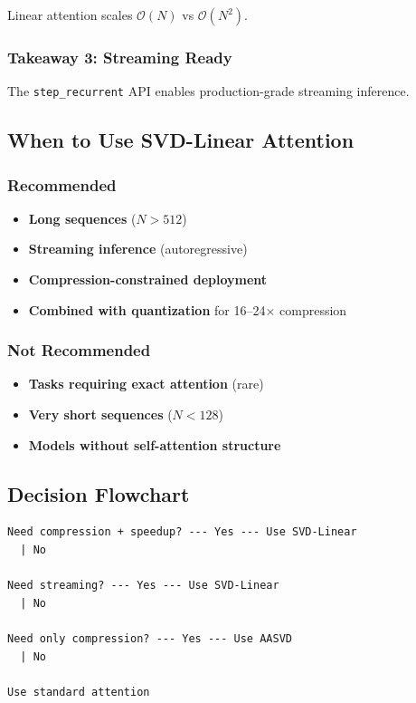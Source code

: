 Linear attention scales $\mathcal{O}(N)$ vs $\mathcal{O}(N^2)$.

\subsubsection{Takeaway 3: Streaming Ready}

The \texttt{step\_recurrent} API enables production-grade streaming inference.

\subsection{When to Use SVD-Linear Attention}

\subsubsection{Recommended}

\begin{itemize}
\item \textbf{Long sequences} ($N > 512$)
\item \textbf{Streaming inference} (autoregressive)
\item \textbf{Compression-constrained deployment}
\item \textbf{Combined with quantization} for 16--24$\times$ compression

\end{itemize}
\subsubsection{Not Recommended}

\begin{itemize}
\item \textbf{Tasks requiring exact attention} (rare)
\item \textbf{Very short sequences} ($N < 128$)
\item \textbf{Models without self-attention structure}

\end{itemize}
\subsection{Decision Flowchart}

\begin{lstlisting}
Need compression + speedup? --- Yes --- Use SVD-Linear
  | No
   
Need streaming? --- Yes --- Use SVD-Linear
  | No
   
Need only compression? --- Yes --- Use AASVD
  | No
   
Use standard attention
\end{lstlisting}

